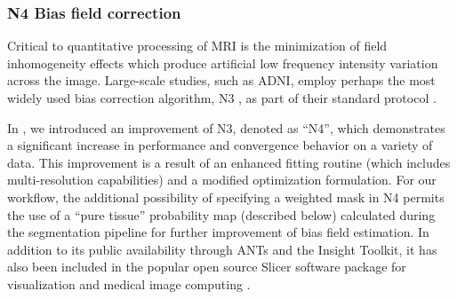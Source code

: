 %


\subsubsection{N4 Bias field correction}

Critical to quantitative processing of MRI is the minimization of
field inhomogeneity effects which produce artificial low frequency 
intensity variation across the image.  Large-scale studies, such
as ADNI, employ
perhaps the most widely used bias correction algorithm, N3 \citep{sled1998}, 
as part of their standard protocol \citep{boyes2008}.

In \cite{tustison2010}, we introduced an improvement of N3, denoted as
``N4'', which demonstrates a significant increase in performance and convergence behavior
on a variety of data.  This improvement is a result of an enhanced 
fitting routine (which includes multi-resolution capabilities) and a modified optimization 
formulation.  For our workflow, the additional possibility of specifying
a weighted mask in N4 permits the use of a ``pure tissue'' probability map 
(described below)
calculated during the segmentation pipeline for further improvement of 
bias field estimation.  In addition to its public availability 
through ANTs and the Insight Toolkit, it has also been included in
the popular open source Slicer software package for visualization and medical
image computing \citep{fedorov2011}.


